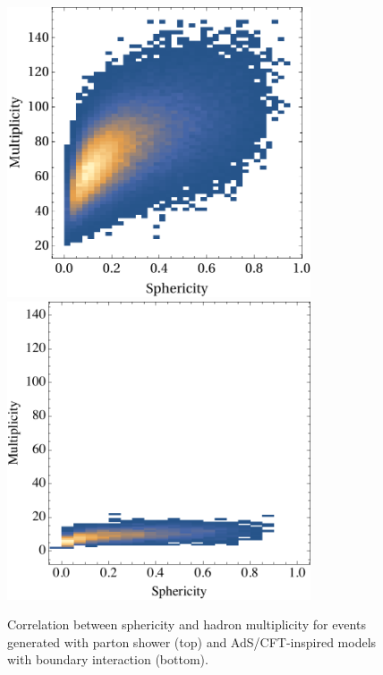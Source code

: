 \begin{figure}[tb!]
	\centering
		\includegraphics[width=0.8\textwidth]{figures/DS_sphericity_PartonShower.pdf}\\
	\vspace{1cm}
	\includegraphics[width=0.8\textwidth]{figures/DS_sphericity_KK_bdry.pdf}
	\caption{Correlation between sphericity and hadron multiplicity for events generated with parton shower (top) and AdS/CFT-inspired models with boundary interaction (bottom).}
	\label{fig:compmult}
\end{figure}


